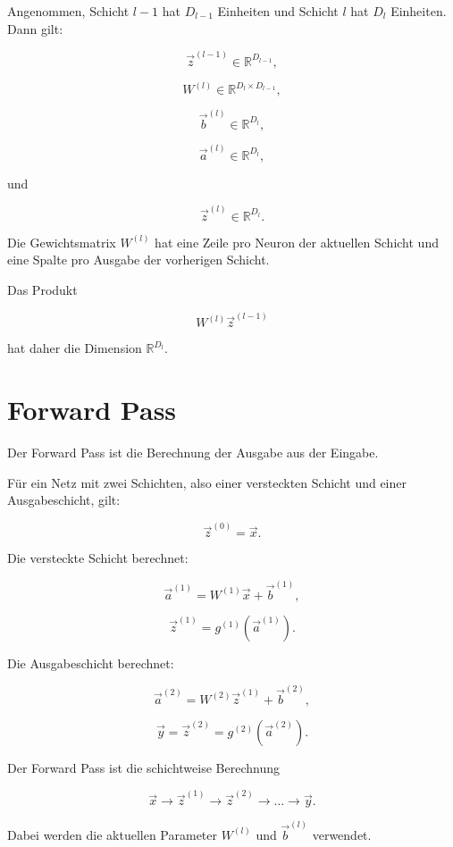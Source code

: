 Angenommen, Schicht \(l-1\) hat \(D_{l-1}\) Einheiten und Schicht \(l\) hat \(D_l\) Einheiten.
Dann gilt:

\[
    \vec{z}^{(l-1)} \in \mathbb{R}^{D_{l-1}},
\]

\[
    W^{(l)} \in \mathbb{R}^{D_l \times D_{l-1}},
\]

\[
    \vec{b}^{(l)} \in \mathbb{R}^{D_l},
\]

\[
    \vec{a}^{(l)} \in \mathbb{R}^{D_l},
\]

und

\[
    \vec{z}^{(l)} \in \mathbb{R}^{D_l}.
\]

\begin{notebox}
Die Gewichtsmatrix \(W^{(l)}\) hat eine Zeile pro Neuron der aktuellen Schicht und eine Spalte pro Ausgabe der vorherigen Schicht.

Das Produkt

\[
    W^{(l)}\vec{z}^{(l-1)}
\]

hat daher die Dimension \(\mathbb{R}^{D_l}\).
\end{notebox}

\section{Forward Pass}

Der Forward Pass ist die Berechnung der Ausgabe aus der Eingabe.

Für ein Netz mit zwei Schichten, also einer versteckten Schicht und einer Ausgabeschicht, gilt:

\[
    \vec{z}^{(0)}
    =
    \vec{x}.
\]

Die versteckte Schicht berechnet:

\[
    \vec{a}^{(1)}
    =
    W^{(1)}\vec{x}
    +
    \vec{b}^{(1)},
\]

\[
    \vec{z}^{(1)}
    =
    g^{(1)}(\vec{a}^{(1)}).
\]

Die Ausgabeschicht berechnet:

\[
    \vec{a}^{(2)}
    =
    W^{(2)}\vec{z}^{(1)}
    +
    \vec{b}^{(2)},
\]

\[
    \vec{y}
    =
    \vec{z}^{(2)}
    =
    g^{(2)}(\vec{a}^{(2)}).
\]

\begin{definitionbox}
Der Forward Pass ist die schichtweise Berechnung

\[
    \vec{x}
    \longrightarrow
    \vec{z}^{(1)}
    \longrightarrow
    \vec{z}^{(2)}
    \longrightarrow
    \dots
    \longrightarrow
    \vec{y}.
\]

Dabei werden die aktuellen Parameter \(W^{(l)}\) und \(\vec{b}^{(l)}\) verwendet.
\end{definitionbox}


